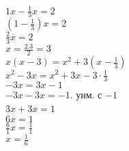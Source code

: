 \documentclass{article}
\theoremstyle{plain}
\begin{document}
$1x - \frac{1}{3}x = 2 $\\
$(1-\frac{1}{3})x = 2 $\\
$\frac{2}{3}x = 2 $ \\
$x = \frac{2.3}{2} = 3  $
\\


$ x(x-3 ) = x^2 +3(x-\frac{1}{3})$ \\
$x^2 - 3x = x^2 + 3x - 3\cdot\frac{1}{3}$ \\
$-3x = 3x -1 $ \\
$ -3x -3x = -1  $. унм. с  $-1 $ \\
 $ 3x + 3x = 1 $
$  $ \\
$6x = 1 $\\
$\frac{6}{1}x = \frac{1}{1} $\\
$x = \frac{1}{6} $
\end{document}
